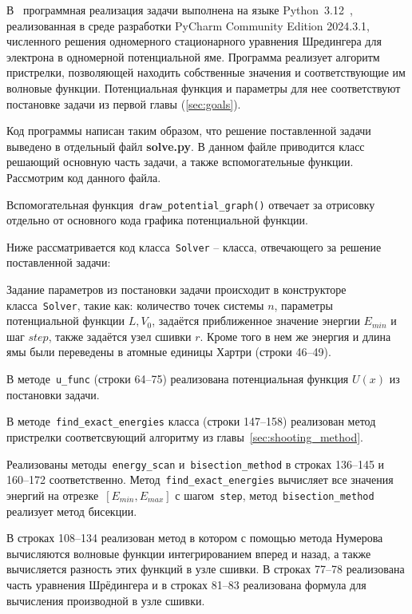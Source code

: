 В~ программная реализация задачи выполнена на языке Python~3.12~\cite{python}, реализованная в среде разработки PyCharm Community Edition 2024.3.1, численного решения одномерного стационарного уравнения Шредингера для электрона в одномерной потенциальной яме.
Программа реализует алгоритм пристрелки, позволяющей находить собственные значения и соответствующие им волновые функции.
Потенциальная функция и параметры для нее соответствуют постановке задачи из первой главы (\ref{sec:goals}).


Код программы написан таким образом, что решение поставленной задачи выведено в отдельный файл \textbf{solve.py}.
В данном файле приводится класс решающий основную часть задачи, а также вспомогательные функции.
Рассмотрим код данного файла.

Вспомогательная функция~\lstinline[language=Python, columns=fixed]{draw_potential_graph()} отвечает за отрисовку отдельно от основного кода графика потенциальной функции.


Ниже рассматривается код класса~\lstinline[columns=fixed]{Solver} -- класса, отвечающего за решение поставленной задачи:

Задание параметров из постановки задачи происходит в конструкторе класса~\lstinline[columns=fixed]{Solver}, такие как: количество точек системы $n$, параметры потенциальной функции $L,V_0$, задаётся приближенное значение энергии $E_{min}$ и шаг $step$, также задаётся узел сшивки $r$.
Кроме того в нем же энергия и длина ямы были переведены в атомные единицы Хартри (строки 46--49).

В методе~\lstinline[columns=fixed]{u_func} (строки 64--75) реализована потенциальная функция $U(x)$ из постановки задачи.


В методе~\lstinline[columns=fixed]{find_exact_energies} класса (строки 147--158) реализован метод пристрелки соответсвующий алгоритму из главы~\ref{sec:shooting_method}.


Реализованы методы~\lstinline[columns=fixed]{energy_scan} и~\lstinline[columns=fixed]{bisection_method} в строках 136--145 и 160--172 соответственно.
Метод~\lstinline[columns=fixed]{find_exact_energies} вычисляет все значения энергий на отрезке~$\left[ E_{min}, E_{max} \right]$ с шагом~\lstinline[columns=fixed]{step},
метод~\lstinline[columns=fixed]{bisection_method} реализует метод бисекции.


В строках 108--134 реализован метод в котором с помощью метода Нумерова вычисляются волновые функции интегрированием вперед и назад, а также вычисляется разность этих функций в узле сшивки.
В строках 77--78 реализована часть уравнения Шрёдингера и в строках 81--83 реализована формула для вычисления производной в узле сшивки.


